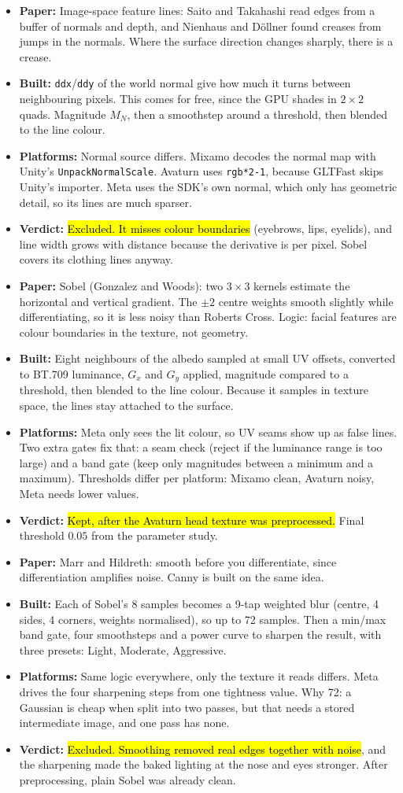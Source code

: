 \documentclass[11pt,a4paper]{article}
\newcommand{\key}[1]{\hl{#1}}
\newcommand{\tech}[5]{\needspace{10\baselineskip}\vspace{0.6em}{\bfseries #1}\par\vspace{0.1em}\begin{itemize}[leftmargin=1.2em,itemsep=0.05em,topsep=0.1em]\small\item\textbf{Paper:} #2 \item\textbf{Built:} #3 \item\textbf{Platforms:} #4 \item\textbf{Verdict:} #5\end{itemize}}
\begin{document}
\tech{V3 — Screen-Space Normal Edge Detection}
{Image-space feature lines: Saito and Takahashi read edges from a buffer of normals and depth, and Nienhaus and Döllner found creases from jumps in the normals. Where the surface direction changes sharply, there is a crease.}
{\texttt{ddx}/\texttt{ddy} of the world normal give how much it turns between neighbouring pixels. This comes for free, since the GPU shades in $2\times2$ quads. Magnitude $M_N$, then a smoothstep around a threshold, then blended to the line colour.}
{Normal source differs. Mixamo decodes the normal map with Unity's \texttt{UnpackNormalScale}. Avaturn uses \texttt{rgb*2-1}, because GLTFast skips Unity's importer. Meta uses the SDK's own normal, which only has geometric detail, so its lines are much sparser.}
{\key{Excluded. It misses colour boundaries} (eyebrows, lips, eyelids), and line width grows with distance because the derivative is per pixel. Sobel covers its clothing lines anyway.}

\tech{V4 — Sobel Edge Detection}
{Sobel (Gonzalez and Woods): two $3\times3$ kernels estimate the horizontal and vertical gradient. The $\pm2$ centre weights smooth slightly while differentiating, so it is less noisy than Roberts Cross. Logic: facial features are colour boundaries in the texture, not geometry.}
{Eight neighbours of the albedo sampled at small UV offsets, converted to BT.709 luminance, $G_x$ and $G_y$ applied, magnitude compared to a threshold, then blended to the line colour. Because it samples in texture space, the lines stay attached to the surface.}
{Meta only sees the lit colour, so UV seams show up as false lines. Two extra gates fix that: a seam check (reject if the luminance range is too large) and a band gate (keep only magnitudes between a minimum and a maximum). Thresholds differ per platform: Mixamo clean, Avaturn noisy, Meta needs lower values.}
{\key{Kept, after the Avaturn head texture was preprocessed.} Final threshold $0.05$ from the parameter study.}

\tech{V4.2 — Gaussian Prefiltered Sobel}
{Marr and Hildreth: smooth before you differentiate, since differentiation amplifies noise. Canny is built on the same idea.}
{Each of Sobel's 8 samples becomes a 9-tap weighted blur (centre, 4 sides, 4 corners, weights normalised), so up to 72 samples. Then a min/max band gate, four smoothsteps and a power curve to sharpen the result, with three presets: Light, Moderate, Aggressive.}
{Same logic everywhere, only the texture it reads differs. Meta drives the four sharpening steps from one tightness value. Why 72: a Gaussian is cheap when split into two passes, but that needs a stored intermediate image, and one pass has none.}
{\key{Excluded. Smoothing removed real edges together with noise}, and the sharpening made the baked lighting at the nose and eyes stronger. After preprocessing, plain Sobel was already clean.}
\end{document}
